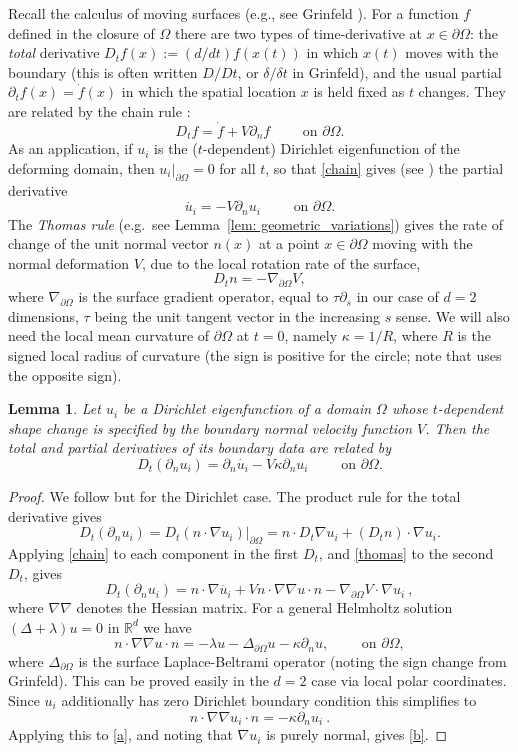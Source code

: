\documentclass{amsart}
\newcommand{\be}{\begin{equation}}
\newcommand{\ee}{\end{equation}}
\newcommand{\R}{\mathbb{R}}
\newcommand{\pO}{{\partial\Omega}}
\newcommand{\dn}{{\partial_n}}
\theoremstyle{plain}
\newtheorem{lemma}[theorem]{Lemma}
\begin{document}
Recall the calculus of moving surfaces (e.g., see Grinfeld \cite[\S3.2]{grin10}).
For a function $f$ defined in the closure of $\Omega$
there are two types of time-derivative at $x\in\pO$:
the {\em total} derivative $D_t f(x) := (d/dt)f(x(t))$
in which $x(t)$ moves with the boundary
(this is often written $D/Dt$, or $\delta/\delta t$ in Grinfeld),
and the usual partial $\partial_t f(x)= \dot{f}(x)$ in which
the spatial location $x$ is held fixed as $t$ changes.
They are related by the chain rule \cite[(42)]{grin10}:
\be
D_t f = \dot{f} + V \dn f \qquad \mbox{ on } \pO.
\label{chain}
\ee
As an application, if $u_i$ is the ($t$-dependent)
Dirichlet eigenfunction of the deforming domain, then
$u_i|_\pO = 0$ for all $t$, so that \eqref{chain}
gives (see \cite[(70)]{grin10}) the partial derivative
\be
\dot{u_i} = - V \dn u_i  \qquad \mbox{ on } \pO.
\label{dotdat}
\ee
The {\em Thomas rule}
(e.g.\ see Lemma~\ref{lem: geometric_variations})
gives the rate of change of the unit normal vector $n(x)$
at a point $x\in\pO$ moving with the normal deformation $V$,
due to the local rotation rate of the surface,
\be
D_t n = -\nabla_\pO V,
\label{thomas}
\ee
where $\nabla_\pO$ is the surface gradient operator,
equal to $\tau \partial_s$ in our case of $d=2$ dimensions,
$\tau$ being the unit tangent vector in the increasing $s$ sense.
We will also need the local mean curvature of $\pO$ at $t=0$,
namely $\kappa=1/R$, where $R$ is the signed local radius of curvature
(the sign is positive for the circle; note that \cite[p.664]{grin10} uses the opposite sign).

\begin{lemma}  %
  Let $u_i$ be a Dirichlet eigenfunction of a domain $\Omega$ whose
  $t$-dependent shape change is specified by the boundary normal velocity
  function $V$. Then the total and partial derivatives of its boundary data are
  related by
  \be
  D_t (\dn u_i) = \dn\dot{u_i} - V \kappa \dn u_i  \qquad \mbox{ on } \pO.
  \label{b}
  \ee
  \label{l:dt}
\end{lemma}
\begin{proof}
We follow \cite[Sec.~4.2]{grin10} but for the Dirichlet case. %
The product rule for the total derivative gives
$$
D_t (\dn u_i) = D_t(n\cdot\nabla u_i)|_\pO
= n\cdot D_t \nabla u_i + (D_t n)\cdot \nabla u_i.
$$
Applying \eqref{chain} to each component in the first $D_t$, and \eqref{thomas} to the second $D_t$,
gives
\be
D_t (\dn u_i) =  n\cdot\nabla\dot{u_i} + V n\cdot\nabla\nabla u\cdot n - \nabla_\pO V \cdot\nabla u_i~,
\label{a}
\ee
where $\nabla \nabla$ denotes the Hessian matrix.
For a general Helmholtz solution $(\Delta+\lambda)u=0$ in $\R^d$ we have \cite[(74)]{grin10}
$$
 n\cdot\nabla\nabla u\cdot n = -\lambda u - \Delta_\pO u
- \kappa \dn u, \qquad \mbox{ on } \pO,
$$
where $\Delta_\pO$ is the surface Laplace-Beltrami operator (noting
the sign change from Grinfeld).
This can be proved easily in the $d=2$ case via local polar coordinates.
Since $u_i$ additionally has zero Dirichlet boundary condition this simplifies to
$$
n\cdot\nabla\nabla u_i\cdot n =  -\kappa \dn u_i~.
$$
Applying this to \eqref{a}, and noting that $\nabla u_i$ is purely normal,
gives \eqref{b}.
\end{proof}
\end{document}
